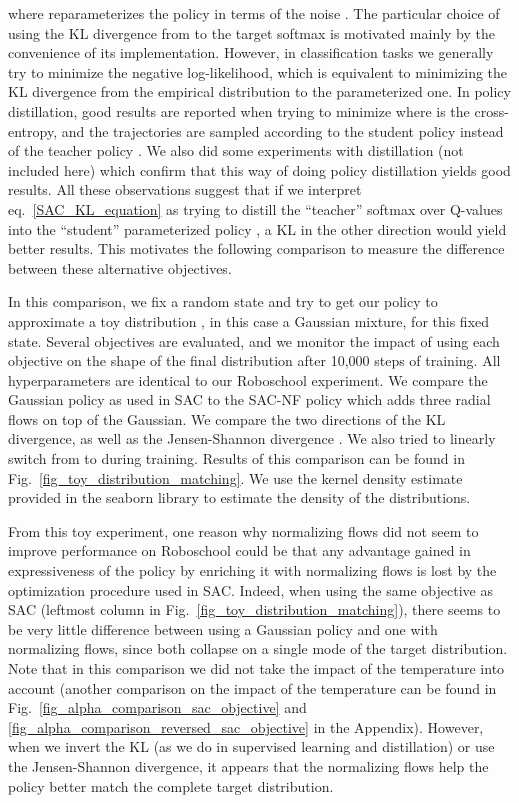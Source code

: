 \documentclass[letterpaper]{article} \usepackage{aaai20}  \usepackage{times}  \usepackage{helvet} \usepackage{courier}  \usepackage[hyphens]{url}  \usepackage{graphicx} \urlstyle{rm} \def\UrlFont{\rm}  \usepackage{graphicx}  \usepackage[section]{placeins}
\begin{document}
where  reparameterizes the policy in terms of the noise . The particular choice of using the KL divergence from  to the target softmax is motivated mainly by the convenience of its implementation. However, in classification tasks we generally try to minimize the negative log-likelihood, which is equivalent to minimizing the KL divergence from the empirical distribution to the parameterized one. In policy distillation, \cite{czarnecki2019distilling,parisotto2015actor,schmitt2018kickstarting} good results are reported when trying to minimize  where  is the cross-entropy, and the trajectories are sampled according to the student policy  instead of the teacher policy . We also did some experiments with distillation (not included here) which confirm that this way of doing policy distillation yields good results. All these observations suggest that if we interpret eq.~\ref{SAC_KL_equation} as trying to distill the ``teacher'' softmax over Q-values into the ``student'' parameterized policy , a KL in the other direction would yield better results. This motivates the following comparison to measure the difference between these alternative objectives.

In this comparison, we fix a random state  and try to get our policy to approximate a toy distribution , in this case a Gaussian mixture, for this fixed state. Several objectives are evaluated, and we monitor the impact of using each objective on the shape of the final distribution after 10,000 steps of training. All hyperparameters are identical to our Roboschool experiment. We compare the Gaussian policy as used in SAC to the SAC-NF policy which adds three radial flows on top of the Gaussian. We compare the two directions of the KL divergence, as well as the Jensen-Shannon divergence \cite{lin1991divergence}. We also tried to linearly switch from  to  during training. Results of this comparison can be found in Fig.~\ref{fig_toy_distribution_matching}. We use the kernel density estimate provided in the seaborn library \cite{waskom2018seaborn} to estimate the density of the distributions. 

From this toy experiment, one reason why normalizing flows did not seem to improve performance on Roboschool could be that any advantage gained in expressiveness of the policy by enriching it with normalizing flows is lost by the optimization procedure used in SAC. Indeed, when using the same objective as SAC (leftmost column in Fig.~\ref{fig_toy_distribution_matching}), there seems to be very little difference between using a Gaussian policy and one with normalizing flows, since both collapse on a single mode of the target distribution. Note that in this comparison we did not take the impact of the temperature into account (another comparison on the impact of the temperature can be found in Fig.~\ref{fig_alpha_comparison_sac_objective} and \ref{fig_alpha_comparison_reversed_sac_objective} in the Appendix). However, when we invert the KL (as we do in supervised learning and distillation) or use the Jensen-Shannon divergence, it appears that the normalizing flows help the policy better match the complete target distribution.
\end{document}
